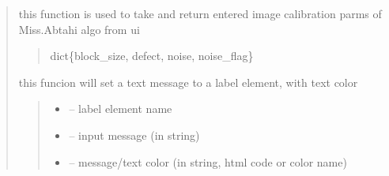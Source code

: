\documentclass[letterpaper,10pt,english]{sphinxmanual}
\begin{document}
\begin{quote}
\begin{savenotes}
\begin{fulllineitems}
\begin{savenotes}\begin{fulllineitems}
\label{\detokenize{setting/setting_UI:oxin.setting_UI.UI_main_window.set_image_proccessing_parms_to_ui}}
\pysigstartsignatures
{}
\pysigstopsignatures
\sphinxAtStartPar
this function is used to take and return entered image calibration parms of Miss.Abtahi algo from ui
\begin{quote}\begin{description}
\sphinxAtStartPar
dict\{block\_size, defect, noise, noise\_flag\}

\end{description}\end{quote}

\end{fulllineitems}\end{savenotes}


\begin{savenotes}\begin{fulllineitems}
\label{\detokenize{setting/setting_UI:oxin.setting_UI.UI_main_window.set_label}}
\pysigstartsignatures
{}
\pysigstopsignatures
\sphinxAtStartPar
this funcion will set a text message to a label element, with text color
\begin{quote}\begin{description}
\begin{itemize}
\item {} 
\sphinxAtStartPar
{} – label element name

\item {} 
\sphinxAtStartPar
{} – input message (in string)

\item {} 
\sphinxAtStartPar
{} – message/text color (in string, html code or color name)

\end{itemize}


\end{description}
\end{quote}
\end{fulllineitems}
\end{savenotes}
\end{fulllineitems}
\end{savenotes}
\end{quote}
\end{document}

